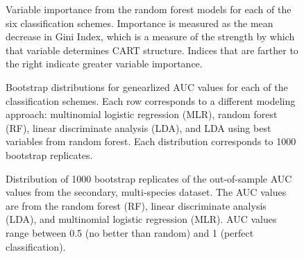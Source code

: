 \documentclass[12pt,letterpaper]{article}
\begin{document}
\begin{figure}[ht]
  \centering
  \caption{Variable importance from the random forest models for each of the six classification schemes. Importance is measured as the mean decrease in Gini Index, which is a measure of the strength by which that variable determines CART structure. Indices that are farther to the right indicate greater variable importance.}
  \label{fig:var_imp}
\end{figure}

\begin{figure}[ht]
  \centering
  \caption{Bootstrap distributions for genearlized AUC values for each of the classification schemes. Each row corresponds to a different modeling approach: multinomial logistic regression (MLR), random forest (RF), linear discriminate analysis (LDA), and LDA using best variables from random forest. Each distribution corresponds to 1000 bootstrap replicates.}
  \label{fig:gen_hist}
\end{figure}

\begin{figure}[ht]
  \centering
  \caption{Distribution of 1000 bootstrap replicates of the out-of-sample AUC values from the secondary, multi-species dataset. The AUC values are from the random forest (RF), linear discriminate analysis (LDA), and multinomial logistic regression (MLR). AUC values range between 0.5 (no better than random) and 1 (perfect classification).}
  \label{fig:seven_boot}
\end{figure}
\end{document}
